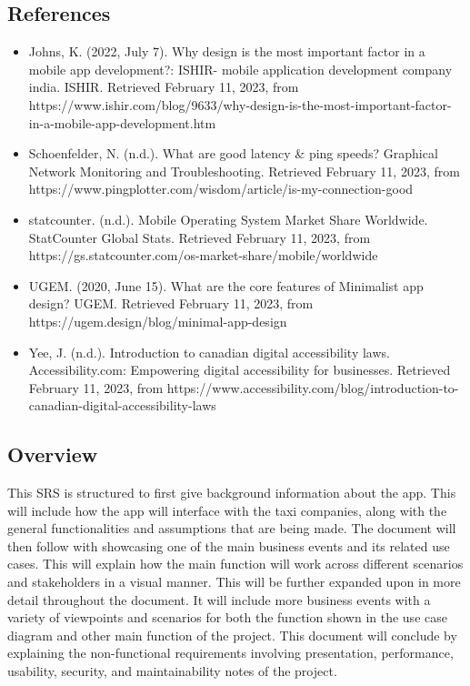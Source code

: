 \documentclass[]{article}
\begin{document}
\subsection{References}
\label{sub:references}
\begin{itemize}
	\item Johns, K. (2022, July 7). Why design is the most important factor in a mobile app development?: ISHIR- mobile application development company india. ISHIR. Retrieved February 11, 2023, from https://www.ishir.com/blog/9633/why-design-is-the-most-important-factor-in-a-mobile-app-development.htm 
	\item Schoenfelder, N. (n.d.). What are good latency \& ping speeds? Graphical Network Monitoring and Troubleshooting. Retrieved February 11, 2023, from https://www.pingplotter.com/wisdom/article/is-my-connection-good 
	\item statcounter. (n.d.). Mobile Operating System Market Share Worldwide. StatCounter Global Stats. Retrieved February 11, 2023, from https://gs.statcounter.com/os-market-share/mobile/worldwide 
	\item UGEM. (2020, June 15). What are the core features of Minimalist app design? UGEM. Retrieved February 11, 2023, from https://ugem.design/blog/minimal-app-design 
	\item Yee, J. (n.d.). Introduction to canadian digital accessibility laws. Accessibility.com: Empowering digital accessibility for businesses. Retrieved February 11, 2023, from https://www.accessibility.com/blog/introduction-to-canadian-digital-accessibility-laws 
\end{itemize}

\subsection{Overview}
\label{sub:overview}
This SRS is structured to first give background information about the app. This will include how the app will interface with the taxi companies, along with the general functionalities and assumptions that are being made. The document will then follow with showcasing one of the main business events and its related use cases. This will explain how the main function will work across different scenarios and stakeholders in a visual manner. This will be further expanded upon in more detail throughout the document. It will include more business events with a variety of viewpoints and scenarios for both the function shown in the use case diagram and other main function of the project. This document will conclude by explaining the non-functional requirements involving presentation, performance, usability, security, and maintainability notes of the project.
\end{document}
